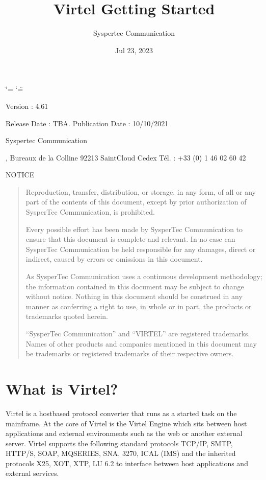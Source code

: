 \documentclass[letterpaper,10pt,english]{sphinxmanual}
\title{Virtel Getting Started}
\date{Jul 23, 2023}
\author{Syspertec Communication}
\begin{document}
\ifdefined\shorthandoff
  \ifnum\catcode`\=\string=\active\shorthandoff{=}\fi
  \ifnum\catcode`\"=\active{}\fi
\fi

\pagestyle{empty}
\sphinxmaketitle
\pagestyle{plain}
\sphinxtableofcontents
\pagestyle{normal}
\label{\detokenize{Getting_Started::doc}}


\sphinxAtStartPar
{}

\sphinxAtStartPar
Version : 4.61

\sphinxAtStartPar
Release Date : TBA. Publication Date : 10/10/2021

\sphinxAtStartPar
Syspertec Communication

, Bureaux de la Colline 92213 Saint\sphinxhyphen{}Cloud Cedex Tél. : +33 (0) 1 46 02 60 42

\sphinxAtStartPar
{}

\sphinxAtStartPar
NOTICE
\begin{quote}

\sphinxAtStartPar
Reproduction, transfer, distribution, or storage, in any form, of all or any part of
the contents of this document, except by prior authorization of SysperTec
Communication, is prohibited.

\sphinxAtStartPar
Every possible effort has been made by SysperTec Communication to ensure that this document
is complete and relevant. In no case can SysperTec Communication be held responsible for
any damages, direct or indirect, caused by errors or omissions in this document.

\sphinxAtStartPar
As SysperTec Communication uses a continuous development methodology; the information
contained in this document may be subject to change without notice. Nothing in this
document should be construed in any manner as conferring a right to use, in whole or in
part, the products or trademarks quoted herein.

\sphinxAtStartPar
“SysperTec Communication” and “VIRTEL” are registered trademarks. Names of other products
and companies mentioned in this document may be trademarks or registered trademarks of
their respective owners.
\end{quote}


\chapter{What is Virtel?}
\label{\detokenize{Getting_Started:what-is-virtel}}
\sphinxAtStartPar
Virtel is a host\sphinxhyphen{}based protocol converter that runs as a started task on the mainframe. At the core of Virtel is the Virtel Engine which sits between host applications and external environments such as the web or another external server. Virtel supports the following standard protocols \sphinxhyphen{} TCP/IP, SMTP, HTTP/S, SOAP, MQ\sphinxhyphen{}SERIES, SNA, 3270, ICAL (IMS) and the inherited protocols \sphinxhyphen{} X25, XOT, XTP, LU 6.2 to interface between host applications and external services.
\end{document}
